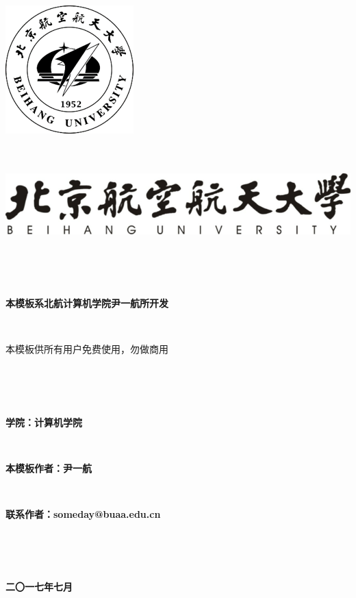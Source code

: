 \documentclass{ctexart}
\newcommand{\erhao}{\fontsize{21pt}\selectfont}
\newcommand{\sanhao}{\fontsize{15.75pt}\selectfont}
\newcommand{\sihao}{\fontsize{14pt}\selectfont}
\begin{document}
\lhead{}%
\rhead{}%


\setcounter{secnumdepth}{0}%





\includegraphics[scale=1]{include_picture/xiaohui.png}
\ \\ 
\ \\
\ \\
\begin{center}
\includegraphics[scale=1]{include_picture/xiaoming.png}
\end{center}
\ \\
\ \\
\ \\
\erhao
\centerline{\textbf{本模板系北航计算机学院尹一航所开发}}
\ \\
\centerline{本模板供所有用户免费使用，勿做商用}
\ \\
\ \\
\ \\
\sihao
\centerline{\textbf{学院：计算机学院}}
\ \\
\centerline{\textbf{本模板作者：尹一航}}
\ \\
\centerline{\textbf{联系作者：someday@buaa.edu.cn}}
\ \\
\ \\ 
\ \\
\sanhao
\centerline{\textbf{二〇一七年七月}}
\end{document}
